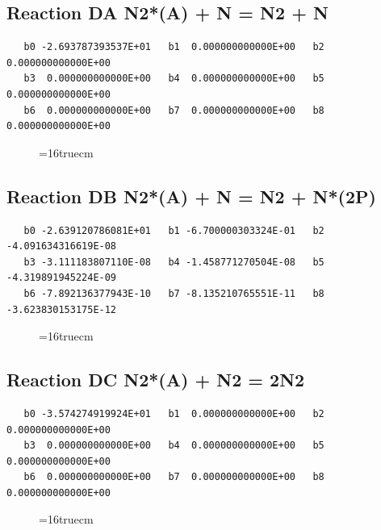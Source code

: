 \documentclass[12pt,dvipdfm]{article}
\begin{document}
\subsection{
Reaction DA N2*(A) + N = N2 + N }
\begin{small}\begin{verbatim}
   b0 -2.693787393537E+01   b1  0.000000000000E+00   b2  0.000000000000E+00
   b3  0.000000000000E+00   b4  0.000000000000E+00   b5  0.000000000000E+00
   b6  0.000000000000E+00   b7  0.000000000000E+00   b8  0.000000000000E+00
\end{verbatim}\end{small}
\begin{figure}[h!] \label{n2rates}
\epsfxsize=16truecm
\end{figure}
\newpage

\subsection{
Reaction DB N2*(A) + N = N2 + N*(2P) }
\begin{small}\begin{verbatim}
   b0 -2.639120786081E+01   b1 -6.700000303324E-01   b2 -4.091634316619E-08
   b3 -3.111183807110E-08   b4 -1.458771270504E-08   b5 -4.319891945224E-09
   b6 -7.892136377943E-10   b7 -8.135210765551E-11   b8 -3.623830153175E-12
\end{verbatim}\end{small}
\begin{figure}[h!] \label{n2rates}
\epsfxsize=16truecm
\end{figure}
\newpage

\subsection{
Reaction DC N2*(A) + N2 = 2N2 }
\begin{small}\begin{verbatim}
   b0 -3.574274919924E+01   b1  0.000000000000E+00   b2  0.000000000000E+00
   b3  0.000000000000E+00   b4  0.000000000000E+00   b5  0.000000000000E+00
   b6  0.000000000000E+00   b7  0.000000000000E+00   b8  0.000000000000E+00
\end{verbatim}\end{small}
\begin{figure}[h!] \label{n2rates}
\epsfxsize=16truecm
\end{figure}
\newpage
\end{document}
